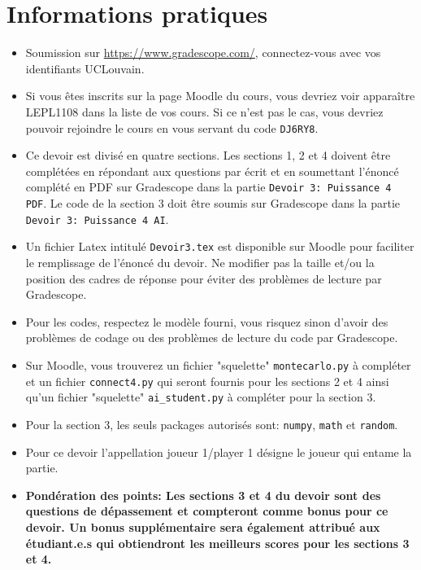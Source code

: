 \documentclass[11pt,answers]{exam}
\begin{document}
\section*{Informations pratiques}
\begin{itemize}
\setlength{\itemsep}{0mm}
	\item Soumission sur \url{https://www.gradescope.com/}, connectez-vous avec vos identifiants UCLouvain.
	\item Si vous êtes inscrits sur la page Moodle du cours, vous devriez voir apparaître LEPL1108 dans la liste de vos cours. Si ce n'est pas le cas, vous devriez pouvoir rejoindre le cours en vous servant du code \texttt{DJ6RY8}. 
        \item Ce devoir est divisé en quatre sections. Les sections 1, 2 et 4 doivent \^etre complétées en répondant aux questions par écrit et en soumettant l'énoncé complété en PDF sur Gradescope dans la partie \texttt{Devoir 3: Puissance 4 PDF}. Le code de la section 3 doit \^etre soumis sur Gradescope dans la partie \texttt{Devoir 3: Puissance 4 AI}.
        \item Un fichier Latex intitulé \texttt{Devoir3.tex} est disponible sur Moodle pour faciliter le remplissage de l'énoncé du devoir. Ne modifier pas la taille et/ou la position des cadres de réponse pour éviter des problèmes de lecture par Gradescope.
	\item Pour les codes, respectez le modèle fourni, vous risquez sinon d’avoir des problèmes de codage ou des problèmes de lecture du code par Gradescope.
        \item Sur Moodle, vous trouverez un fichier "squelette" \texttt{montecarlo.py} à compléter et un fichier \texttt{connect4.py} qui seront fournis pour les sections 2 et 4 ainsi qu'un fichier "squelette" \texttt{ai\_student.py} à compléter pour la section 3.
	\item Pour la section 3, les seuls packages autorisés sont: \texttt{numpy}, \texttt{math} et \texttt{random}.
        \item Pour ce devoir l'appellation joueur 1/player 1 désigne le joueur qui entame la partie.
        \item \textbf{Pondération des points: Les sections 3 et 4 du devoir sont des questions de dépassement et compteront comme bonus pour ce devoir. Un bonus supplémentaire sera également attribué aux étudiant.e.s qui obtiendront les meilleurs scores pour les sections 3 et 4.}
\end{itemize}


\newpage
\end{document}
